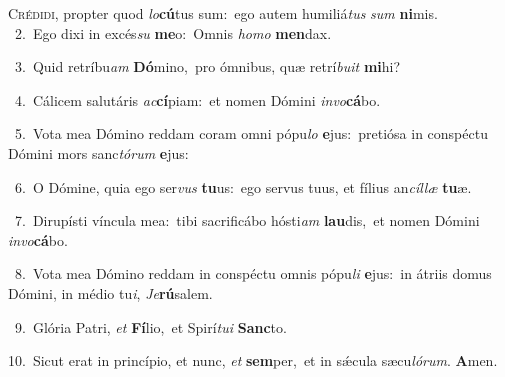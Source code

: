\lettrine{\initial\textcolor{\initialcolor}{C}}{rédidi,} propter quod \textit{lo}\-\textbf{cú}tus sum:~\star ego autem humiliá\textit{tus} \textit{sum} \textbf{ni}\-mis.\\
{\numbfont\textcolor{\numbcolor}{~2.}}~Ego dixi in excés\textit{su} \textbf{me}\-o:~\star Omnis \textit{ho}\-\textit{mo} \textbf{men}\-dax.\par
{\numbfont\textcolor{\numbcolor}{~3.}}~Quid retríbu\textit{am} \textbf{Dó}\-mino,~\star pro ómnibus, quæ retrí\-\textit{bu}\-\textit{it} \textbf{mi}\-hi?\par
{\numbfont\textcolor{\numbcolor}{~4.}}~Cálicem salutáris \textit{ac}\-\textbf{cí}piam:~\star et nomen Dómini \textit{in}\-\textit{vo}\textbf{cá}bo.\par
{\numbfont\textcolor{\numbcolor}{~5.}}~Vota mea Dómino reddam coram omni pópu\textit{lo} \textbf{e}\-jus:~\star pretiósa in conspéctu Dómini mors sanc\-\textit{tó}\-\textit{rum} \textbf{e}\-jus:\par
{\numbfont\textcolor{\numbcolor}{~6.}}~O Dómine, quia ego ser\textit{vus} \textbf{tu}\-us:~\star ego servus tuus, et fílius an\-\textit{cíl}\-\textit{læ} \textbf{tu}\-æ.\par
{\numbfont\textcolor{\numbcolor}{~7.}}~Dirupísti víncula mea:~\dagger tibi sacrificábo hósti\textit{am} \textbf{lau}\-dis,~\star et nomen Dómini \textit{in}\-\textit{vo}\textbf{cá}bo.\par
{\numbfont\textcolor{\numbcolor}{~8.}}~Vota mea Dómino reddam in conspéctu omnis pópu\textit{li} \textbf{e}\-jus:~\star in átriis domus Dómini, in médio tu\-\textit{i}\-, \textit{Je}\-\textbf{rú}salem.\par
{\numbfont\textcolor{\numbcolor}{~9.}}~Glória Patri, \textit{et} \textbf{Fí}\-lio,~\star et Spirí\-\textit{tu}\-\textit{i} \textbf{Sanc}\-to.\par
{\numbfont\textcolor{\numbcolor}{10.}}~Sicut erat in princípio, et nunc, \textit{et} \textbf{sem}\-per,~\star et in sǽcula sæcu\-\textit{ló}\-\textit{rum}. \textbf{A}\-men.\par
